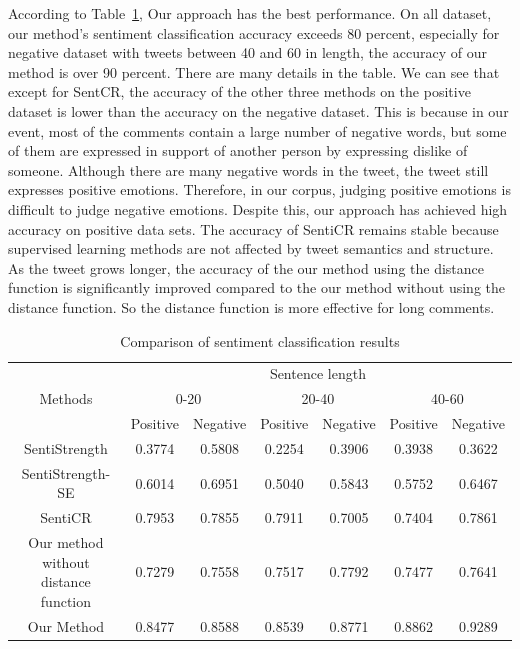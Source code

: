 \documentclass[runningheads]{llncs}
\begin{document}
According to Table~\ref{table:sentiment classification}, Our approach has the best performance. On all dataset, our method's sentiment classification accuracy exceeds 80 percent, especially for negative dataset with tweets between 40 and 60 in length, the accuracy of our method is over 90 percent. There are many details in the table. We can see that except for SentCR, the accuracy of the other three methods on the positive dataset is lower than the accuracy on the negative dataset. This is because in our event, most of the comments contain a large number of negative words, but some of them are expressed in support of another person by expressing dislike of someone. Although there are many negative words in the tweet, the tweet still expresses positive emotions. Therefore, in our corpus, judging positive emotions is difficult to judge negative emotions. Despite this, our approach has achieved high accuracy on positive data sets. The accuracy of SentiCR remains stable because supervised learning methods are not affected by tweet semantics and structure. As the tweet grows longer, the accuracy of the our method using the distance function is significantly improved compared to the our method without using the distance function. So the distance function is more effective for long comments.

\begin{table}[ht]
\caption{Comparison of sentiment classification results}\label{table:sentiment classification}
\begin{center}
\begin{tabular}{|c|c|c|c|c|c|c|}
\hline
\multirow{3}{*}{Methods}             & \multicolumn{6}{c|}{Sentence length}                                                \\ \cline{2-7} 
                                     & \multicolumn{2}{c|}{0-20} & \multicolumn{2}{c|}{20-40} & \multicolumn{2}{c|}{40-60} \\ \cline{2-7} 
                                     & Positive    & Negative    & Positive     & Negative    & Positive     & Negative    \\ \hline
SentiStrength                        & 0.3774      & 0.5808      & 0.2254       & 0.3906      & 0.3938       & 0.3622      \\ \hline
SentiStrength-SE                     & 0.6014      & 0.6951      & 0.5040       & 0.5843      & 0.5752       & 0.6467      \\ \hline
SentiCR                              & 0.7953      & 0.7855      & 0.7911       & 0.7005      & 0.7404       & 0.7861      \\ \hline
Our method without distance function & 0.7279      & 0.7558      & 0.7517       & 0.7792      & 0.7477       & 0.7641      \\ \hline
Our Method                           & 0.8477      & 0.8588      & 0.8539       & 0.8771      & 0.8862       & 0.9289      \\ \hline
\end{tabular}
\end{center}
\end{table}
\end{document}
